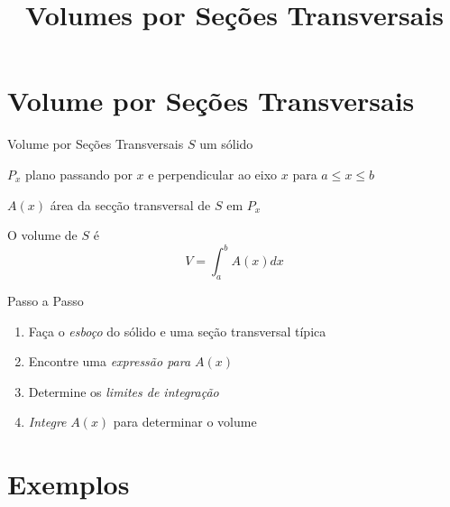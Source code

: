 \documentclass[fleqn,utf8,aspectratio=169,12pt]{beamer}
\title{Volumes por Seções Transversais}
\begin{document}
\addtitle

\section{Volume por Seções Transversais}


\begin{frame}{Volume por Seções Transversais}
  \emph{$S$}    \tabto{10mm} um sólido

  \pause
  \vspace{\baselineskip}
  \emph{$P_x$}  \tabto{10mm} plano passando por $x$ e perpendicular ao
                             eixo $x$ para $a \leq x \leq b$

  \pause
  \vspace{\baselineskip}
  \emph{$A(x)$} \tabto{10mm} área da secção transversal de $S$ em $P_x$

  \pause
  \vspace{\baselineskip}
  O volume de $S$ é
  \[
    V = \int_a^b A(x)dx
  \]
\end{frame}

\begin{frame}{Passo a Passo}
\begin{enumerate}[<+->]
  \setlength\itemsep{1em}
  \item Faça o \emph{esboço} do sólido e uma seção transversal típica
  \item Encontre uma \emph{expressão para $A(x)$}
  \item Determine os \emph{limites de integração}
  \item \emph{Integre} $A(x)$ para determinar o volume
\end{enumerate}
\end{frame}

\section{Exemplos}
\end{document}
